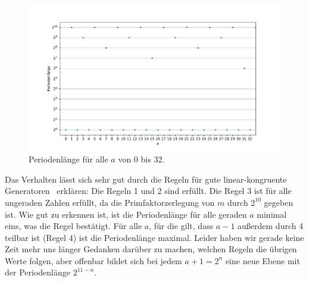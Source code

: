 \documentclass[a4paper, 11pt]{article}
\begin{document}
\begin{figure}
    \centering
    \includegraphics[width=\textwidth]{../A09/A9a_zoom.pdf}
    \caption{Periodenlänge für alle $a$ von 0 bis 32.}
    \label{fig:9a_zoom}
\end{figure}

Das Verhalten lässt sich sehr gut durch die Regeln für gute linear-kongruente Generatoren~\cite[S.~7]{skript} erklären: Die Regeln 1 und 2 sind erfüllt. Die Regel 3 ist für alle ungeraden Zahlen erfüllt, da die Primfaktorzerlegung von $m$ durch $2^{10}$ gegeben ist. Wie gut zu erkennen ist, ist die Periodenlänge für alle geraden $a$ minimal eins, was die Regel bestätigt. Für alle $a$, für die gilt, dass $a-1$ außerdem durch 4 teilbar ist (Regel 4) ist die Periodenlänge maximal. Leider haben wir gerade keine Zeit mehr uns länger Gedanken darüber zu machen, welchen Regeln die übrigen Werte folgen, aber offenbar bildet sich bei jedem $a+1 = 2^{n}$ eine neue Ebene mit der Periodenlänge $2^{11 - n}$.
\FloatBarrier
\end{document}
